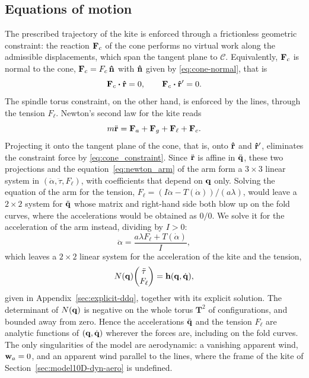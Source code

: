 \subsection{Equations of motion} \label{sec:model-eom}
The prescribed trajectory of the kite is enforced through a frictionless geometric constraint: the reaction \(\vb F_c\) of the cone performs no virtual work along the admissible displacements, which span the tangent plane to \(\mathscr{C}\).
Equivalently, \(\vb F_c\) is normal to the cone, \(\vb F_c = F_c\,\vu n\) with \(\vu n\) given by \eqref{eq:cone-normal}, that is
\begin{equation} \label{eq:cone_constraint}
    \vb F_c \vdot \vu r = 0, \qquad
    \vb F_c \vdot \vu r' = 0.
\end{equation}
The spindle torus constraint, on the other hand, is enforced by the lines, through the tension \(F_\ell\).
Newton's second law for the kite reads
\begin{equation} \label{eq:newton_kite}
    m \ddot{\vb r} = \vb F_a + \vb F_g + \vb F_\ell + \vb F_c.
\end{equation}
Projecting it onto the tangent plane of the cone, that is, onto \(\vu r\) and \(\vu r'\), eliminates the constraint force by \eqref{eq:cone_constraint}.
Since \(\ddot{\vb r}\) is affine in \(\ddot{\vb q}\), these two projections and the equation~\eqref{eq:newton_arm} of the arm form a \(3\times3\) linear system in \((\ddot\alpha, \ddot\tau, F_\ell)\), with coefficients that depend on \(\vb q\) only.
Solving the equation of the arm for the tension, \(F_\ell = (I\ddot\alpha - T(\dot\alpha))/(a\lambda)\), would leave a \(2\times2\) system for \(\ddot{\vb q}\) whose matrix and right-hand side both blow up on the fold curves, where the accelerations would be obtained as \(0/0\).
We solve it for the acceleration of the arm instead, dividing by \(I>0\):
\begin{equation} \label{eq:ddalpha}
    \ddot\alpha = \frac{a\lambda F_\ell + T(\dot\alpha)}{I},
\end{equation}
which leaves a \(2\times2\) linear system for the acceleration of the kite and the tension,
\begin{equation} \label{eq:eom_regular}
    N(\vq) \mqty(\ddot\tau \\ F_\ell) = \vb h(\vq, \dq),
\end{equation}
given in Appendix~\ref{sec:explicit-ddq}, together with its explicit solution.
The determinant of \(N(\vb q)\) is negative on the whole torus \(\mathbf{T}^2\) of configurations, and bounded away from zero.
Hence the accelerations \(\ddot{\vb q}\) and the tension \(F_\ell\) are analytic functions of \((\vb q, \dot{\vb q})\) wherever the forces are, including on the fold curves.
The only singularities of the model are aerodynamic: a vanishing apparent wind, \(\vb w_a = 0\), and an apparent wind parallel to the lines, where the frame of the kite of Section~\ref{sec:model10D-dyn-aero} is undefined.

